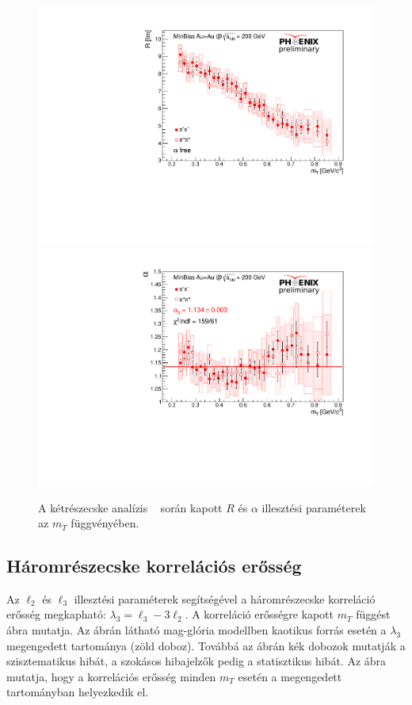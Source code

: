 \documentclass[11pt,a4paper]{article}
\numberwithin{equation}{subsection}
\numberwithin{figure}{section}
\begin{document}
\begin{figure}[H]
\centering
\includegraphics[scale=0.39]{pic/res/R_preliminary_stamp.pdf}
\includegraphics[scale=0.39]{pic/res/alpha_preliminary_stamp.pdf}
\caption{A kétrészecske analízis ~\cite{AN1244} során kapott $R$ és $\alpha$ illesztési paraméterek az $m_T$ függvényében.}
\label{fig:aR}
\end{figure}

\subsection{Háromrészecske korrelációs erősség}

Az $\ell_2$ és $\ell_3$ illesztési paraméterek segítségével a háromrészecske korreláció erősség megkapható: $\lambda_3=\ell_3-3\ell_2$. A korreláció erősségre kapott $m_T$ függést ~ ábra mutatja. Az ábrán látható mag-glória modellben kaotikus forrás esetén a $\lambda_3$ megengedett tartománya (zöld doboz). Továbbá az ábrán kék dobozok mutatják a szisztematikus hibát, a szokásos hibajelzők pedig a statisztikus hibát. Az ábra mutatja, hogy a korrelációs erősség minden $m_T$ esetén a megengedett tartományban helyezkedik el.
\end{document}
